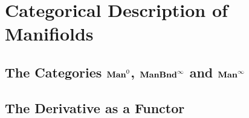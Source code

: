 \documentclass{book}
\begin{document}
	
	
	
	
	
	
	
	
	
	
	
	
	
	
	\newpage
	\chapter{Categorical Description of Manifiolds}
	
	\section{The Categories $\operatorname*{\text{\textbf{Man}}^0}$, $\operatorname*{\text{\textbf{ManBnd}}^{\infty}}$ and $\operatorname*{\text{\textbf{Man}}^{\infty}}$}
	
	
	
	
	
	
	
	
	
	
	
	
	
	
	
	
	
	
	
	
	
	
	
	
	
	
	
	
	
	
	
	
	
	
	
	
	
	
	
	
	
	
	
	
	\section{The Derivative as a Functor}
	
	
	
	
	
	
	
	
	
	
	
	
	
	
	
	
	
	
	
	
	
	
	
	
	
	
	
	
	
\end{document}
